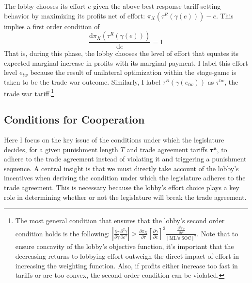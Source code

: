 \documentclass[authoryear, review]{elsarticle}
\newcommand{\bta}{\bm{\tau^a}}
\newcommand{\ga}{\gamma}
\begin{document}
The lobby chooses its effort $e$ given the above best response tariff-setting behavior by maximizing its profits net of effort: $\pi_X\left(\tau^R\left(\ga\left(e\right)\right)\right) - e$. This implies a first order condition of
\begin{equation}
	\frac{\mathrm{d} \pi_X(\tau^R(\ga(e)))}{\mathrm{d} e} = 1
  \label{eq:lobtw}
\end{equation}
That is, during this phase, the lobby chooses the level of effort that equates its expected marginal increase in profits with its marginal payment. I label this effort level $e_{tw}$ because the result of unilateral optimization within the stage-game is taken to be the trade war outcome. Similarly, I label $\tau^R(\ga(e_{tw}))$ as $\tau^{tw}$, the trade war tariff.\footnote{The most general condition that ensures that the lobby's second order condition holds is the following: $\left| \frac{\partial \tau}{\partial \ga}\frac{\partial^2 \ga}{\partial e^2}\right|>\frac{\partial \pi_X}{\partial \tau}\left[\frac{\partial \ga}{\partial e}\right]^2\frac{\frac{\partial^2 \pi_X}{\partial \tau^2}}{\left[\text{ML's SOC}\right]^2}$. Note that to ensure concavity of the lobby's objective function, it's important that the decreasing returns to lobbying effort outweigh the direct impact of effort in increasing the weighting function. Also, if profits either increase too fast in tariffs or are too convex, the second order condition can be violated.\label{fn:lobsoc}}

\subsection{Conditions for Cooperation}
\label{sec:coop}
Here I focus on the key issue of the conditions under which the legislature decides, for a given punishment length $T$ and trade agreement tariffs $\bta$, to adhere to the trade agreement instead of violating it and triggering a punishment sequence. A central insight is that we must directly take account of the lobby's incentives when deriving the condition under which the legislature adheres to the trade agreement. This is necessary because the lobby's effort choice plays a key role in determining whether or not the legislature will break the trade agreement. 
\end{document}
